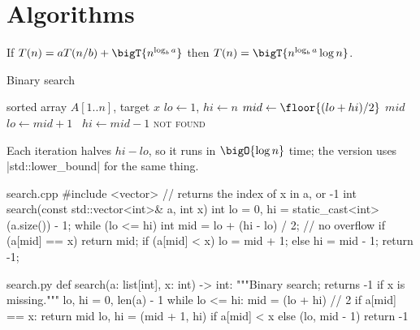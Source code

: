 \documentclass[10pt]{article}
\begin{document}
\section{Algorithms}

\begin{theorem*}
  If $T(n) = aT(n/b) + \bigT{n^{\log_b a}}$ then $T(n) = \bigT{n^{\log_b a}\log n}$.
\end{theorem*}

\begin{pseudo}{Binary search}
  \begin{algorithmic}[1]
    \Require sorted array $A[1..n]$, target $x$
    \State $lo \gets 1$, $hi \gets n$
      \State $mid \gets \floor{(lo + hi)/2}$ 
       \Return $mid$
       $lo \gets mid + 1$
      \Else\ $hi \gets mid - 1$
      \EndIf
    \EndWhile
    \State \Return \textsc{not found}
  \end{algorithmic}
\end{pseudo}

Each iteration halves $hi - lo$, so it runs in $\bigO{\log n}$ time; the \CC{} version uses
\code|std::lower_bound| for the same thing.

\begin{codeblock}{search.cpp}
#include <vector>
// returns the index of x in a, or -1
int search(const std::vector<int>& a, int x) {
    int lo = 0, hi = static_cast<int>(a.size()) - 1;
    while (lo <= hi) {
        int mid = lo + (hi - lo) / 2;      // no overflow
        if (a[mid] == x) return mid;
        if (a[mid] < x) lo = mid + 1; else hi = mid - 1;
    }
    return -1;
}
\end{codeblock}

\begin{codeblock}[lang=Python]{search.py}
def search(a: list[int], x: int) -> int:
    """Binary search; returns -1 if x is missing."""
    lo, hi = 0, len(a) - 1
    while lo <= hi:
        mid = (lo + hi) // 2
        if a[mid] == x:
            return mid
        lo, hi = (mid + 1, hi) if a[mid] < x else (lo, mid - 1)
    return -1
\end{codeblock}

\end{document}
